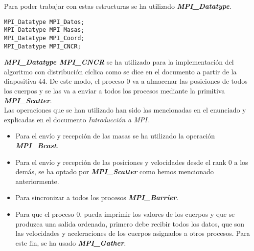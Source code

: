 \documentclass[11pt]{article}
\begin{document}
Para poder trabajar con estas estructuras se ha utilizado \textbf{\textit{MPI\_Datatype}}.
\begin{lstlisting}[style=C,numbers=none]
MPI_Datatype MPI_Datos;
MPI_Datatype MPI_Masas;
MPI_Datatype MPI_Coord;
MPI_Datatype MPI_CNCR;
\end{lstlisting}
\textbf{\textit{MPI\_Datatype MPI\_CNCR}} se ha utilizado para la implementación del algoritmo con distribución cíclica como se dice en el documento a partir de la diapositiva 44. De este modo, el proceso 0 va a almacenar las posiciones de todos los cuerpos y se las va a enviar a todos los procesos mediante la primitiva \textbf{\textit{MPI\_Scatter}}. \\

Las operaciones que se han utilizado han sido las mencionadas en el enunciado y explicadas en el documento \textit{Introducción a MPI}. \\
\begin{itemize}
	\item Para el envío y recepción de las masas se ha utilizado la operación \textbf{\textit{MPI\_Bcast}}.
	\item Para el envío y recepción de las posiciones y velocidades desde el rank 0 a los demás, se ha optado por 						\textbf{\textit{MPI\_Scatter}} como hemos mencionado anteriormente.
	\item Para sincronizar a todos los procesos \textbf{\textit{MPI\_Barrier}}.
	\item Para que el proceso 0, pueda imprimir los valores de los cuerpos y que se produzca una salida ordenada, primero debe 			recibir todos los datos, que son las velocidades y aceleraciones de los cuerpos asignados a otros procesos. Para este fin, se 	ha usado \textbf{\textit{MPI\_Gather}}.
\end{itemize}

\newpage
\end{document}
